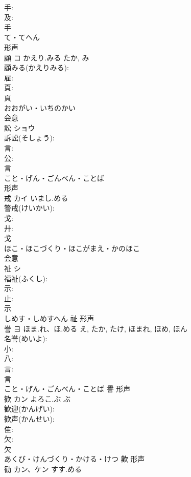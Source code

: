 \documentclass[8pt]{extreport}
\begin{document}
\begin{CJK}{UTF8}{min}
\\	手: 
\\	及: 
\\	手	
\\	て・てへん	
\\	形声 
\\	顧	コ	かえり.みる	たか, み	
\\	顧みる(かえりみる): 
\\	雇: 
\\	頁: 
\\	頁	
\\	おおがい・いちのかい	
\\	会意 
\\	訟	ショウ			
\\	訴訟(そしょう): 
\\	言: 
\\	公: 
\\	言	
\\	こと・げん・ごんべん・ことば	
\\	形声 
\\	戒	カイ	いまし.める		
\\	警戒(けいかい): 
\\	戈: 
\\	廾: 
\\	戈	
\\	ほこ・ほこづくり・ほこがまえ・かのほこ	
\\	会意 
\\	祉	シ			
\\	福祉(ふくし): 
\\	示: 
\\	止: 
\\	示	
\\	しめす・しめすへん	祉	形声 
\\	誉	ヨ	ほま.れ、ほ.める	え, たか, たけ, ほまれ, ほめ, ほん	
\\	名誉(めいよ): 
\\	小: 
\\	八: 
\\	言: 
\\	言	
\\	こと・げん・ごんべん・ことば	譽	形声 
\\	歓	カン	よろこ.ぶ	ぶ	
\\	歓迎(かんげい): 
\\	歓声(かんせい): 
\\	隹: 
\\	欠: 
\\	欠	
\\	あくび・けんづくり・かける・けつ	歡	形声 
\\	勧	カン、ケン	すす.める		

\end{CJK}
\end{document}
